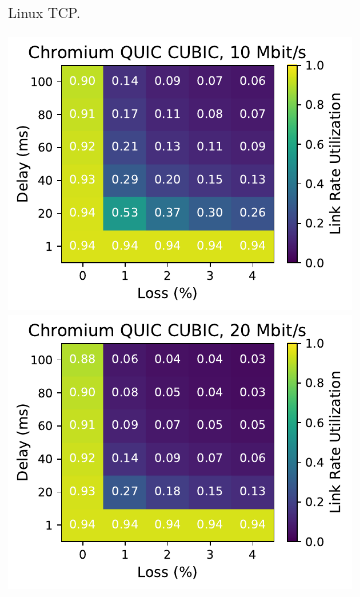 \begin{figure}[ht]
\begin{subfigure}[b]{0.22\linewidth}
        \caption{Linux TCP.}
    \end{subfigure}
    \begin{subfigure}[b]{0.22\linewidth}
        \includegraphics[width=\linewidth,trim={0 0 2cm 0},clip]{figures/heatmaps/heatmap_quic_cubic_10mbps.pdf}
        \includegraphics[width=\linewidth,trim={0 0 2cm 0},clip]{figures/heatmaps/heatmap_quic_cubic_20mbps.pdf}

\end{subfigure}
\end{figure}
